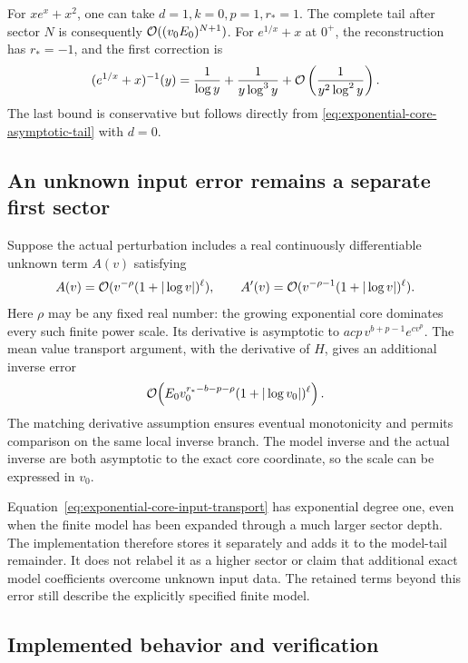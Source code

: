 For $xe^x+x^2$, one can take $d=1,k=0,p=1,r_*=1$.
The complete tail after sector $N$ is consequently
$\mathcal O((v_0E_0)^{N+1})$.
For $e^{1/x}+x$ at $0^+$, the reconstruction has $r_*=-1$,
and the first correction is
\begin{equation}
 (e^{1/x}+x)^{-1}(y)
 =\frac1{\log y}+\frac1{y\log^3y}
 +\mathcal O\left(\frac1{y^2\log^2y}\right).
 \label{eq:finite-endpoint-exponential-core-example}
\end{equation}
The last bound is conservative but follows directly from
\eqref{eq:exponential-core-asymptotic-tail} with $d=0$.

\subsection{An unknown input error remains a separate first sector}

Suppose the actual perturbation includes a real continuously differentiable
unknown term $A(v)$ satisfying
\begin{equation}
 A(v)=\mathcal O(v^{-\rho}(1+|\log v|)^\ell),\qquad
 A'(v)=\mathcal O(v^{-\rho-1}(1+|\log v|)^\ell).
 \label{eq:exponential-core-input-error}
\end{equation}
Here $\rho$ may be any fixed real number: the growing exponential core
dominates every such finite power scale. Its derivative is asymptotic to
$acp\,v^{b+p-1}e^{cv^p}$. The mean value transport argument, with the
derivative of $H$, gives an additional inverse error
\begin{equation}
 \mathcal O\!\left(E_0v_0^{r_*-b-p-\rho}
                  (1+|\log v_0|)^\ell\right).
 \label{eq:exponential-core-input-transport}
\end{equation}
The matching derivative assumption ensures eventual monotonicity and
permits comparison on the same local inverse branch. The model inverse
and the actual inverse are both asymptotic to the exact core coordinate,
so the scale can be expressed in $v_0$.

Equation~\eqref{eq:exponential-core-input-transport} has exponential degree
one, even when the finite model has been expanded through a much larger
sector depth. The implementation therefore stores it separately and adds
it to the model-tail remainder. It does not relabel it as a higher sector
or claim that additional exact model coefficients overcome unknown input
data. The retained terms beyond this error still describe the explicitly
specified finite model.

\subsection{Implemented behavior and verification}

